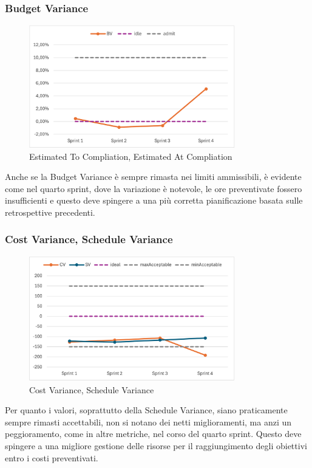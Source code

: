 \subsubsection{Budget Variance}
\begin{figure}[H]
    \centering
    \includegraphics[width=0.8\textwidth]{./images/BV.png}
    \caption{Estimated To Compliation, Estimated At Compliation}
\end{figure}
Anche se la Budget Variance è sempre rimasta nei limiti ammissibili, è evidente come nel quarto sprint, dove la variazione è notevole, le ore preventivate fossero insufficienti e questo deve spingere a una più corretta pianificazione basata sulle retrospettive precedenti.

\subsubsection{Cost Variance, Schedule Variance}
\begin{figure}[H]
    \centering
    \includegraphics[width=0.8\textwidth]{./images/CV-SV.png}
    \caption{Cost Variance, Schedule Variance}
\end{figure}
Per quanto i valori, soprattutto della Schedule Variance, siano praticamente sempre rimasti accettabili, non si notano dei netti miglioramenti, ma anzi un peggioramento, come in altre metriche, nel corso del quarto sprint. Questo deve spingere a una migliore gestione delle risorse per il raggiungimento degli obiettivi entro i costi preventivati.

